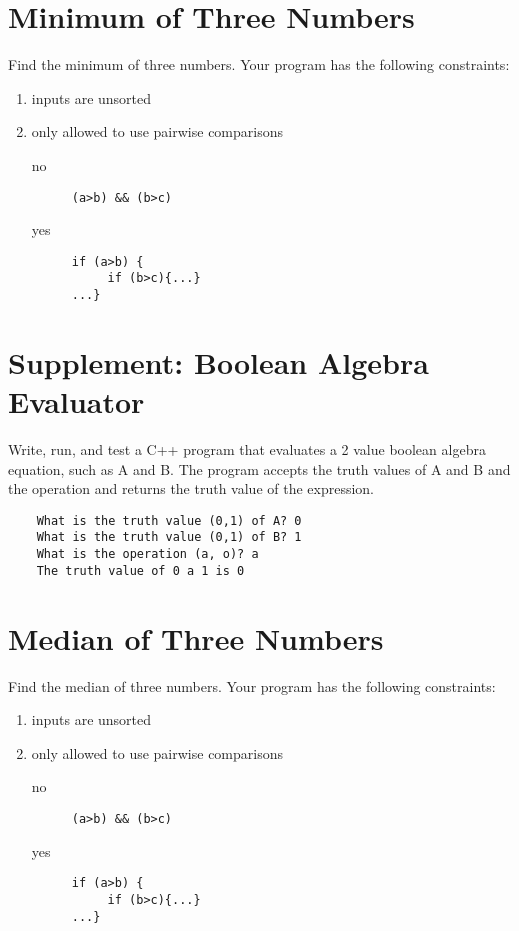 \documentclass{article}
\begin{document}
\section*{Minimum of Three Numbers}
Find the minimum of three numbers. Your program has the following constraints:
\begin{enumerate}
	\item inputs are unsorted
	\item only allowed to use pairwise comparisons
		\begin{description}
			\item [no] 
\begin{verbatim}
(a>b) && (b>c)
\end{verbatim}
\item[yes] 
\begin{verbatim} 
if (a>b) { 
     if (b>c){...}
...}
\end{verbatim}
\end{description} 
\end{enumerate}


\section*{Supplement: Boolean Algebra Evaluator}
Write, run, and test a C++ program that evaluates a 2 value boolean algebra equation, such as A and B.  The program accepts the truth values of A and B and the operation and returns the truth value of the expression. 
\begin{verbatim}
	What is the truth value (0,1) of A? 0
	What is the truth value (0,1) of B? 1
	What is the operation (a, o)? a
	The truth value of 0 a 1 is 0
\end{verbatim}

\section*{Median of Three Numbers}
Find the median of three numbers. Your program has the following constraints:
\begin{enumerate}
	\item inputs are unsorted
	\item only allowed to use pairwise comparisons
		\begin{description}
			\item [no] 
\begin{verbatim}
(a>b) && (b>c)
\end{verbatim}
\item[yes] 
\begin{verbatim} 
if (a>b) { 
     if (b>c){...}
...}
\end{verbatim}
\end{description} 
\end{enumerate}
\end{document}
